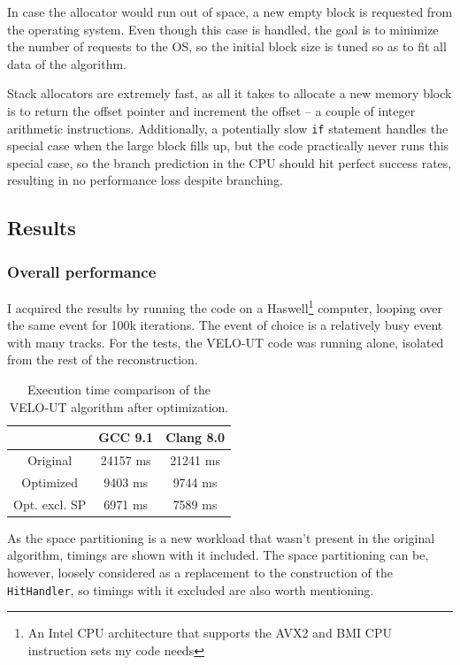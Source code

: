 \documentclass[12pt]{article}
\newcommand{\code}[1]{\texttt{#1}}
\begin{document}
In case the allocator would run out of space, a new empty block is requested from the operating system. Even though this case is handled, the goal is to minimize the number of requests to the OS, so the initial block size is tuned so as to fit all data of the algorithm.

Stack allocators are extremely fast, as all it takes to allocate a new memory block is to return the offset pointer and increment the offset -- a couple of integer arithmetic instructions. Additionally, a potentially slow \code{if} statement handles the special case when the large block fills up, but the code practically never runs this special case, so the branch prediction in the CPU should hit perfect success rates, resulting in no performance loss despite branching.


\subsection{Results}

\subsubsection{Overall performance}

I acquired the results by running the code on a Haswell\footnote{An Intel CPU architecture that supports the AVX2 and BMI CPU instruction sets my code needs} computer, looping over the same event for 100k iterations. The event of choice is a relatively busy event with many tracks. For the tests, the VELO-UT code was running alone, isolated from the rest of the reconstruction.

\begin{table}[H]
	\centering
	\begin{tabular}{c | c | c}
		& GCC 9.1 & Clang 8.0 \\
		\hline
		Original & 24157 ms & 21241 ms \\
		\hline
		Optimized & 9403 ms & 9744 ms \\
		\hline
		Opt. excl. SP & 6971 ms & 7589 ms
	\end{tabular}
	\caption{Execution time comparison of the VELO-UT algorithm after optimization.}
	\label{tbl_runtimes_local}
\end{table}
	
As the space partitioning is a new workload that wasn't present in the original algorithm, timings are shown with it included. The space partitioning can be, however, loosely considered as a replacement to the construction of the \code{HitHandler}, so timings with it excluded are also worth mentioning.
\end{document}
